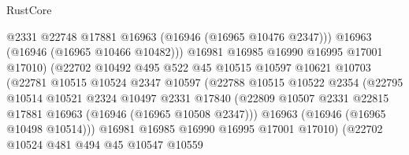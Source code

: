 \begin{lexlean}{RustCore}
\begin{coremodule}
                                    @2331
                                    @22748
                                    @17881
                                    @16963
                                    (@16946 (@16965 @10476 @2347)))
                                  @16963
                                  (@16946 (@16965 @10466 @10482)))
                                @16981
                                @16985
                                @16990
                                @16995
                                @17001
                                @17010)
                              (@22702
                                @10492
                                @495
                                @522
                                @45
                                @10515
                                @10597
                                @10621
                                @10703
                                (@22781
                                  @10515
                                  @10524
                                  @2347
                                  @10597
                                  (@22788
                                    @10515
                                    @10522
                                    @2354
                                    (@22795
                                      @10514
                                      @10521
                                      @2324
                                      @10497
                                      @2331
                                      @17840
                                      (@22809
                                        @10507
                                        @2331
                                        @22815
                                        @17881
                                        @16963
                                        (@16946 (@16965 @10508 @2347)))
                                      @16963
                                      (@16946 (@16965 @10498 @10514)))
                                    @16981
                                    @16985
                                    @16990
                                    @16995
                                    @17001
                                    @17010)
                                  (@22702
                                    @10524
                                    @481
                                    @494
                                    @45
                                    @10547
                                    @10559

\end{coremodule}
\end{lexlean}
